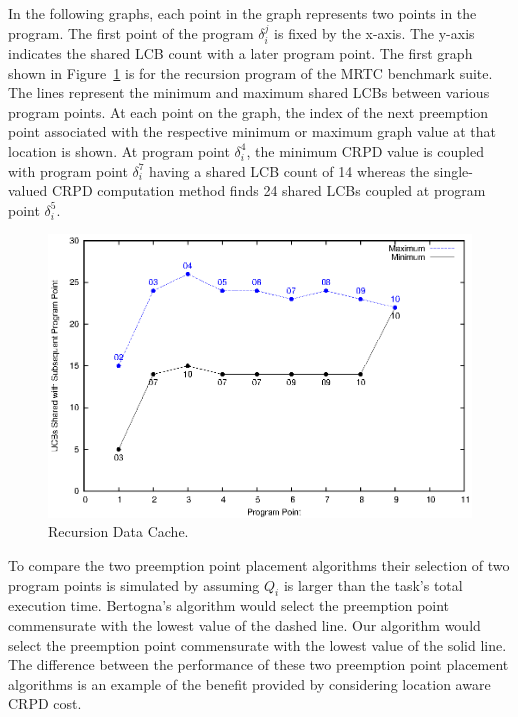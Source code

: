 In the following graphs, each point in the graph represents two points in the program. The first point of the program ${\delta_i^j}$ is fixed by the x-axis. The y-axis indicates the shared LCB count with a later program
point. The first graph shown in Figure~\ref{fig:recusion_data_cache} is for the recursion program of the MRTC benchmark suite.  The lines represent the minimum and maximum shared LCBs between various program points.
At each point on the graph, the index of the next preemption point associated with the respective minimum or maximum graph value at that location is shown.  At program point ${\delta_i^4}$, the minimum CRPD value is coupled with program point ${\delta_i^7}$ having a shared LCB count of 14 whereas the single-valued CRPD computation method finds 24 shared LCBs coupled at program point ${\delta_i^5}$.
%
\begin{figure}[h!]
\vspace{-10pt}
\begin{center}
\includegraphics[width=\linewidth]{eps/recursion-dcache.eps}
\caption{Recursion Data Cache.}
\label{fig:recusion_data_cache}
\end{center}
\vspace{-10pt}
\end{figure}

To compare the two preemption point placement algorithms their selection of two program points is
simulated by assuming ${Q_i}$ is larger than the task's total execution time. Bertogna's algorithm would select the preemption point commensurate with the lowest value of the dashed line. Our algorithm would select the preemption point commensurate with the lowest value of the solid line.  The difference between the performance of these two preemption point placement algorithms is an example of the benefit provided by considering location aware CRPD cost.

